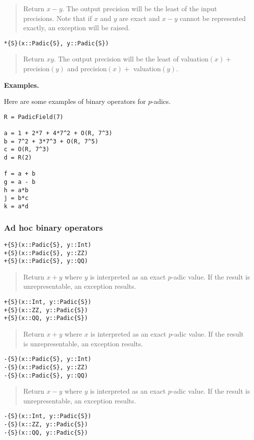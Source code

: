 \documentclass[a4paper,10pt]{article}
\newcommand{\desc}[1]{\vspace{-3mm}\begin{quote}#1\end{quote}}
\begin{document}
{{{\desc{Return $x - y$. The output precision will be the least of the input
precisions. Note that if $x$ and $y$ are exact and $x - y$ cannot be
represented exactly, an exception will be raised.}

\begin{lstlisting}
*{S}(x::Padic{S}, y::Padic{S})
\end{lstlisting}

\desc{Return $xy$. The output precision will be the least of valuation$(x) +$
precision$(y)$ and precision$(x) +$ valuation$(y)$.}

\textbf{Examples.}

Here are some examples of binary operators for $p$-adics.

\begin{lstlisting}
R = PadicField(7)

a = 1 + 2*7 + 4*7^2 + O(R, 7^3)
b = 7^2 + 3*7^3 + O(R, 7^5)
c = O(R, 7^3)
d = R(2)

f = a + b
g = a - b
h = a*b
j = b*c
k = a*d
\end{lstlisting}

\subsubsection{Ad hoc binary operators}

\begin{lstlisting}
+{S}(x::Padic{S}, y::Int)
+{S}(x::Padic{S}, y::ZZ)
+{S}(x::Padic{S}, y::QQ)
\end{lstlisting}

\desc{Return $x + y$ where $y$ is interpreted as an exact $p$-adic value. If
the result is unrepresentable, an exception results.}

\begin{lstlisting}
+{S}(x::Int, y::Padic{S})
+{S}(x::ZZ, y::Padic{S})
+{S}(x::QQ, y::Padic{S})
\end{lstlisting}

\desc{Return $x + y$ where $x$ is interpreted as an exact $p$-adic value. If
the result is unrepresentable, an exception results.}

\begin{lstlisting}
-{S}(x::Padic{S}, y::Int)
-{S}(x::Padic{S}, y::ZZ)
-{S}(x::Padic{S}, y::QQ)
\end{lstlisting}

\desc{Return $x - y$ where $y$ is interpreted as an exact $p$-adic value. If
the result is unrepresentable, an exception results.}

\begin{lstlisting}
-{S}(x::Int, y::Padic{S})
-{S}(x::ZZ, y::Padic{S})
-{S}(x::QQ, y::Padic{S})
\end{lstlisting}

}}}
\end{document}
